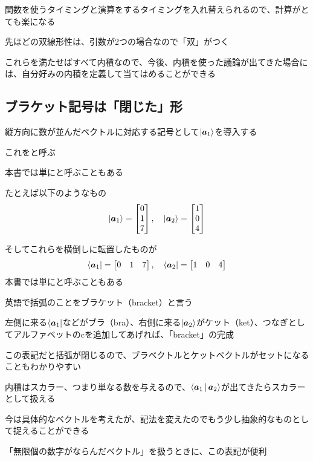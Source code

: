 \documentclass[../book_half_step_linear]{subfiles}
\begin{document}
関数を使うタイミングと演算をするタイミングを入れ替えられるので、計算がとても楽になる

\br

先ほどの双線形性は、引数が2つの場合なので「双」がつく

\sectionline

これらを満たせばすべて内積なので、今後、内積を使った議論が出てきた場合には、自分好みの内積を定義して当てはめることができる

\sectionline
\subsection{ブラケット記号は「閉じた」形}

縦方向に数が並んだベクトルに対応する記号として$\Ket{\vb*{a}_1}$を導入する

これをと呼ぶ

本書では単にと呼ぶこともある

たとえば以下のようなもの
\begin{equation*}
  \Ket{\vb*{a}_1} = \begin{bmatrix} 0 \\ 1 \\ 7 \end{bmatrix}, \quad \Ket{\vb*{a}_2} = \begin{bmatrix} 1 \\ 0 \\ 4 \end{bmatrix}
\end{equation*}

そしてこれらを横倒しに転置したものが
\begin{equation*}
  \Bra{\vb*{a}_1} = \begin{bmatrix} 0 & 1 & 7 \end{bmatrix}, \quad \Bra{\vb*{a}_2} = \begin{bmatrix} 1 & 0 & 4 \end{bmatrix}
\end{equation*}
本書では単にと呼ぶこともある

\br

英語で括弧のことをブラケット（bracket）と言う

左側に来る$\Bra{\vb*{a}_1}$などがブラ（bra）、右側に来る$\Ket{\vb*{a}_2}$がケット（ket）、つなぎとしてアルファベットのcを追加してあげれば、「bracket」の完成

\br

この表記だと括弧が閉じるので、ブラベクトルとケットベクトルがセットになることもわかりやすい

内積はスカラー、つまり単なる数を与えるので、$\Braket{\vb*{a}_1|\vb*{a}_2}$が出てきたらスカラーとして扱える

\br

今は具体的なベクトルを考えたが、記法を変えたのでもう少し抽象的なものとして捉えることができる

「無限個の数字がならんだベクトル」を扱うときに、この表記が便利
\end{document}

